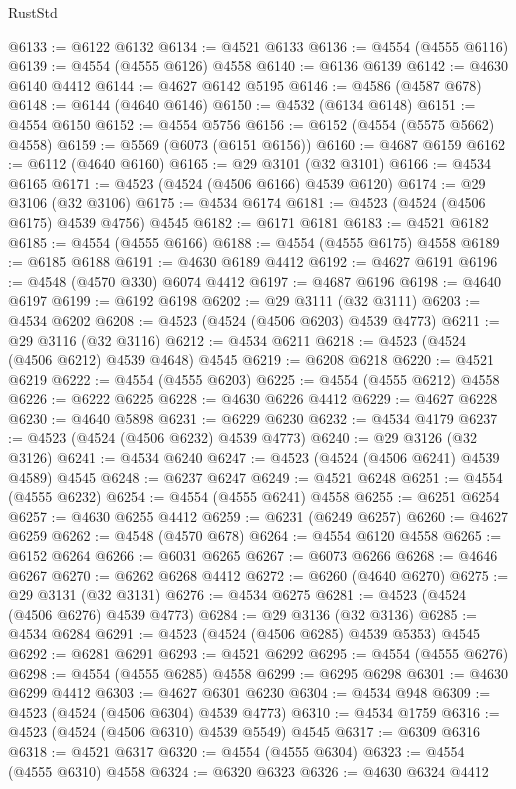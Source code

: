 \begin{lexlean}{RustStd}
\begin{coremodule}
@6133 := @6122 @6132
@6134 := @4521 @6133
@6136 := @4554 (@4555 @6116)
@6139 := @4554 (@4555 @6126) @4558
@6140 := @6136 @6139
@6142 := @4630 @6140 @4412
@6144 := @4627 @6142 @5195
@6146 := @4586 (@4587 @678)
@6148 := @6144 (@4640 @6146)
@6150 := @4532 (@6134 @6148)
@6151 := @4554 @6150
@6152 := @4554 @5756
@6156 := @6152 (@4554 (@5575 @5662) @4558)
@6159 := @5569 (@6073 (@6151 @6156))
@6160 := @4687 @6159
@6162 := @6112 (@4640 @6160)
@6165 := @29 @3101 (@32 @3101)
@6166 := @4534 @6165
@6171 := @4523 (@4524 (@4506 @6166) @4539 @6120)
@6174 := @29 @3106 (@32 @3106)
@6175 := @4534 @6174
@6181 := @4523 (@4524 (@4506 @6175) @4539 @4756) @4545
@6182 := @6171 @6181
@6183 := @4521 @6182
@6185 := @4554 (@4555 @6166)
@6188 := @4554 (@4555 @6175) @4558
@6189 := @6185 @6188
@6191 := @4630 @6189 @4412
@6192 := @4627 @6191
@6196 := @4548 (@4570 @330) @6074 @4412
@6197 := @4687 @6196
@6198 := @4640 @6197
@6199 := @6192 @6198
@6202 := @29 @3111 (@32 @3111)
@6203 := @4534 @6202
@6208 := @4523 (@4524 (@4506 @6203) @4539 @4773)
@6211 := @29 @3116 (@32 @3116)
@6212 := @4534 @6211
@6218 := @4523 (@4524 (@4506 @6212) @4539 @4648) @4545
@6219 := @6208 @6218
@6220 := @4521 @6219
@6222 := @4554 (@4555 @6203)
@6225 := @4554 (@4555 @6212) @4558
@6226 := @6222 @6225
@6228 := @4630 @6226 @4412
@6229 := @4627 @6228
@6230 := @4640 @5898
@6231 := @6229 @6230
@6232 := @4534 @4179
@6237 := @4523 (@4524 (@4506 @6232) @4539 @4773)
@6240 := @29 @3126 (@32 @3126)
@6241 := @4534 @6240
@6247 := @4523 (@4524 (@4506 @6241) @4539 @4589) @4545
@6248 := @6237 @6247
@6249 := @4521 @6248
@6251 := @4554 (@4555 @6232)
@6254 := @4554 (@4555 @6241) @4558
@6255 := @6251 @6254
@6257 := @4630 @6255 @4412
@6259 := @6231 (@6249 @6257)
@6260 := @4627 @6259
@6262 := @4548 (@4570 @678)
@6264 := @4554 @6120 @4558
@6265 := @6152 @6264
@6266 := @6031 @6265
@6267 := @6073 @6266
@6268 := @4646 @6267
@6270 := @6262 @6268 @4412
@6272 := @6260 (@4640 @6270)
@6275 := @29 @3131 (@32 @3131)
@6276 := @4534 @6275
@6281 := @4523 (@4524 (@4506 @6276) @4539 @4773)
@6284 := @29 @3136 (@32 @3136)
@6285 := @4534 @6284
@6291 := @4523 (@4524 (@4506 @6285) @4539 @5353) @4545
@6292 := @6281 @6291
@6293 := @4521 @6292
@6295 := @4554 (@4555 @6276)
@6298 := @4554 (@4555 @6285) @4558
@6299 := @6295 @6298
@6301 := @4630 @6299 @4412
@6303 := @4627 @6301 @6230
@6304 := @4534 @948
@6309 := @4523 (@4524 (@4506 @6304) @4539 @4773)
@6310 := @4534 @1759
@6316 := @4523 (@4524 (@4506 @6310) @4539 @5549) @4545
@6317 := @6309 @6316
@6318 := @4521 @6317
@6320 := @4554 (@4555 @6304)
@6323 := @4554 (@4555 @6310) @4558
@6324 := @6320 @6323
@6326 := @4630 @6324 @4412

\end{coremodule}
\end{lexlean}

